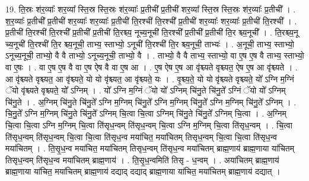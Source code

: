 \documentclass[17pt]{extarticle}
\begin{document}
19. ति॒स्रः श॑र॒व्याः᳚ शर॒व्या᳚ स्ति॒स्र स्ति॒स्रः श॑र॒व्याः᳚ प्र॒तीची᳚ प्र॒तीची॑ शर॒व्या᳚ स्ति॒स्र स्ति॒स्रः श॑र॒व्याः᳚ प्र॒तीची᳚ । . श॒र॒व्याः᳚ प्र॒तीची᳚ प्र॒तीची॑ शर॒व्याः᳚ शर॒व्याः᳚ प्र॒तीची॑ ति॒रश्ची॑ ति॒रश्ची᳚ प्र॒तीची॑ शर॒व्याः᳚ शर॒व्याः᳚ प्र॒तीची॑ ति॒रश्ची᳚ । . प्र॒तीची॑ ति॒रश्ची॑ ति॒रश्ची᳚ प्र॒तीची᳚ प्र॒तीची॑ ति॒रश्च्य॒ नूच्य॒नूची॑ ति॒रश्ची᳚ प्र॒तीची᳚ प्र॒तीची॑ ति॒र श्च्य॒नूची᳚ । . ति॒रश्च्य॒नू च्य॒नूची॑ ति॒रश्ची॑ ति॒र श्च्य॒नूची॒ ताभ्य॒ स्ताभ्यो॒ ऽनूची॑ ति॒रश्ची॑ ति॒र श्च्य॒नूची॒ ताभ्यः॑ । . अ॒नूची॒ ताभ्य॒ स्ताभ्यो॒ ऽनूच्य॒नूची॒ ताभ्यो॒ वै वै ताभ्यो॒ ऽनूच्य॒नूची॒ ताभ्यो॒ वै । . ताभ्यो॒ वै वै ताभ्य॒ स्ताभ्यो॒ वा ए॒ष ए॒ष वै ताभ्य॒ स्ताभ्यो॒ वा ए॒षः । . वा ए॒ष ए॒ष वै वा ए॒ष ऐष वै वा ए॒ष आ । . ए॒ष ऐष ए॒ष आ वृ॑श्च्यते वृश्च्यत॒ ऐष ए॒ष आ वृ॑श्च्यते । . आ वृ॑श्च्यते वृश्च्यत॒ आ वृ॑श्च्यते॒ यो यो वृ॑श्च्यत॒ आ वृ॑श्च्यते॒ यः । . वृ॒श्च्य॒ते॒ यो यो वृ॑श्च्यते वृश्च्यते॒ यो᳚ ऽग्नि म॒ग्निं ॅयो वृ॑श्च्यते वृश्च्यते॒ यो᳚ ऽग्निम् । . यो᳚ ऽग्नि म॒ग्निं ॅयो यो᳚ ऽग्निम् चि॑नु॒ते चि॑नु॒ते᳚ ऽग्निं ॅयो यो᳚ ऽग्निम् चि॑नु॒ते । . अ॒ग्निम् चि॑नु॒ते चि॑नु॒ते᳚ ऽग्नि म॒ग्निम् चि॑नु॒ते᳚ ऽग्नि म॒ग्निम् चि॑नु॒ते᳚ ऽग्नि म॒ग्निम् चि॑नु॒ते᳚ ऽग्निम् । . चि॒नु॒ते᳚ ऽग्नि म॒ग्निम् चि॑नु॒ते चि॑नु॒ते᳚ ऽग्निम् चि॒त्वा चि॒त्वा ऽग्निम् चि॑नु॒ते चि॑नु॒ते᳚ ऽग्निम् चि॒त्वा । . अ॒ग्निम् चि॒त्वा चि॒त्वा ऽग्नि म॒ग्निम् चि॒त्वा ति॑सृध॒न्वम् ति॑सृध॒न्वम् चि॒त्वा ऽग्नि म॒ग्निम् चि॒त्वा ति॑सृध॒न्वम् । . चि॒त्वा ति॑सृध॒न्वम् ति॑सृध॒न्वम् चि॒त्वा चि॒त्वा ति॑सृध॒न्व मया॑चित॒ मया॑चितम् तिसृध॒न्वम् चि॒त्वा चि॒त्वा ति॑सृध॒न्व मया॑चितम् । . ति॒सृ॒ध॒न्व मया॑चित॒ मया॑चितम् तिसृध॒न्वम् ति॑सृध॒न्व मया॑चितम् ब्राह्म॒णाय॑ ब्राह्म॒णाया या॑चितम् तिसृध॒न्वम् ति॑सृध॒न्व मया॑चितम् ब्राह्म॒णाय॑ । . ति॒सृ॒ध॒न्वमिति॑ तिसृ - ध॒न्वम् । . अया॑चितम् ब्राह्म॒णाय॑ ब्राह्म॒णाया या॑चित॒ मया॑चितम् ब्राह्म॒णाय॑ दद्याद् दद्याद् ब्राह्म॒णाया या॑चित॒ मया॑चितम् ब्राह्म॒णाय॑ दद्यात् । \newline
\end{document}

